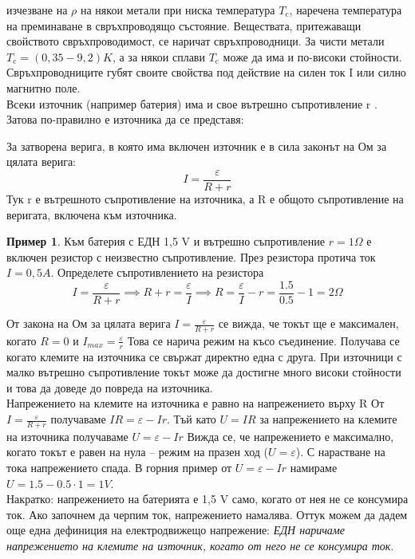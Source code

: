 \documentclass[fleqn, 12pt]{article}
\theoremstyle{definition}
\newtheorem{example}{Пример}[subsection]
\begin{document}
изчезване на $\rho$ на някои метали при ниска температура $T_\text{c}$, наречена температура на
преминаване в свръхпроводящо състояние. Веществата, притежаващи свойството
свръхпроводимост, се наричат свръхпроводници. За чисти метали $T_\text{c} = (0,35 - 9,2) K$, а за
някои сплави $T_\text{c}$ може да има и по-високи стойности. Свръхпроводниците губят своите
свойства под действие на силен ток I или силно магнитно поле. \\
Всеки източник (например батерия) има и свое вътрешно
съпротивление r . Затова по-правилно е източника да се
представя: 
\begin{center}
\end{center}
За затворена верига, в която има включен източник е в сила законът на Ом за
цялата верига: 
$$I = \frac{\varepsilon}{R + r}$$
Тук r е вътрешното съпротивление на източника, а R е 
общото съпротивление на веригата, включена към източника. 
\begin{example}
Към батерия с ЕДН 1,5 V и вътрешно съпротивление $r = 1\Omega$ е
включен резистор с неизвестно съпротивление. През резистора протича ток
$I = 0,5 A$. Определете съпротивлението на резистора
$$I = \frac{\varepsilon}{R + r}  \implies R + r = \frac{\varepsilon}{I} \implies R = \frac{\varepsilon}{I} - r = \frac{1.5}{0.5} - 1 = 2\Omega$$
\end{example}
От закона на Ом за цялата верига $I = \frac{\varepsilon}{R + r}$ се вижда, че токът ще е максимален,
когато $R = 0$ и $I_{max} = \frac{\varepsilon}{r}$  
Това се нарича режим на късо съединение. Получава се когато
клемите на източника се свържат директно една с друга. При източници с малко
вътрешно съпротивление токът може да достигне много високи стойности и това да
доведе до повреда на източника.\\
Напрежението на клемите на източника е равно на напрежението върху R 
От $I = \frac{\varepsilon}{R + r}$ получаваме $IR = \varepsilon - Ir$. Тъй като $U = IR$ за напрежението на
клемите на източника получаваме $U = \varepsilon - Ir$ Вижда се, че напрежението е максимално,
когато токът е равен на нула – режим на празен ход ($U = \varepsilon$). С нарастване на тока
напрежението спада. В горния пример от $U = \varepsilon - Ir$ намираме $U = 1.5 - 0.5 \cdot 1 = 1V$.\\
Накратко: напрежението на батерията е 1,5 V само, когато от нея не се консумира ток.
Ако започнем да черпим ток, напрежението намалява. Оттук можем да дадем още една
дефиниция на електродвижещо напрежение: \textit{ЕДН наричаме напрежението на клемите
на източник, когато от него не се консумира ток}. 
\end{document}
